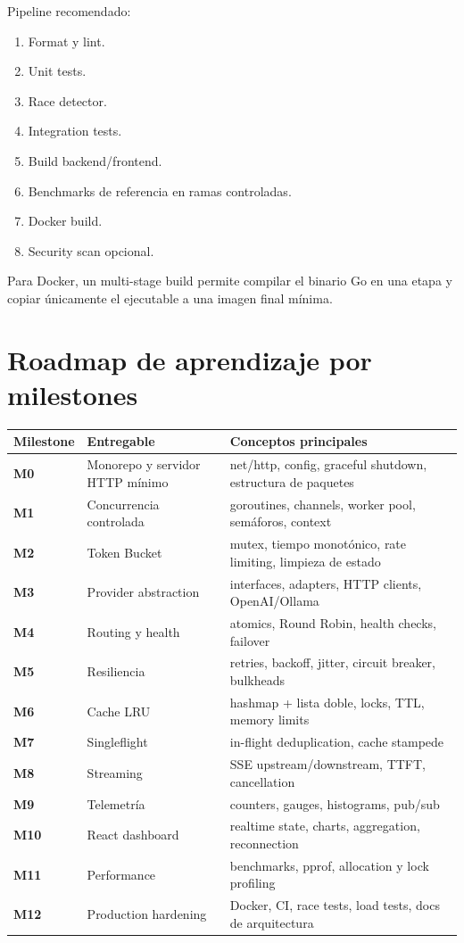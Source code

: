 \documentclass[11pt,a4paper]{article}
\begin{document}
Pipeline recomendado:

\begin{enumerate}
  \item Format y lint.
  \item Unit tests.
  \item Race detector.
  \item Integration tests.
  \item Build backend/frontend.
  \item Benchmarks de referencia en ramas controladas.
  \item Docker build.
  \item Security scan opcional.
\end{enumerate}

Para Docker, un multi-stage build permite compilar el binario Go en una etapa y copiar únicamente el ejecutable a una imagen final mínima.

\section{Roadmap de aprendizaje por milestones}

\begin{longtable}{>{\bfseries}p{2.2cm} p{5.2cm} p{7cm}}
\toprule
Milestone & Entregable & Conceptos principales \\
\midrule
M0 & Monorepo y servidor HTTP mínimo & net/http, config, graceful shutdown, estructura de paquetes \\
M1 & Concurrencia controlada & goroutines, channels, worker pool, semáforos, context \\
M2 & Token Bucket & mutex, tiempo monotónico, rate limiting, limpieza de estado \\
M3 & Provider abstraction & interfaces, adapters, HTTP clients, OpenAI/Ollama \\
M4 & Routing y health & atomics, Round Robin, health checks, failover \\
M5 & Resiliencia & retries, backoff, jitter, circuit breaker, bulkheads \\
M6 & Cache LRU & hashmap + lista doble, locks, TTL, memory limits \\
M7 & Singleflight & in-flight deduplication, cache stampede \\
M8 & Streaming & SSE upstream/downstream, TTFT, cancellation \\
M9 & Telemetría & counters, gauges, histograms, pub/sub \\
M10 & React dashboard & realtime state, charts, aggregation, reconnection \\
M11 & Performance & benchmarks, pprof, allocation y lock profiling \\
M12 & Production hardening & Docker, CI, race tests, load tests, docs de arquitectura \\
\bottomrule
\end{longtable}
\end{document}
